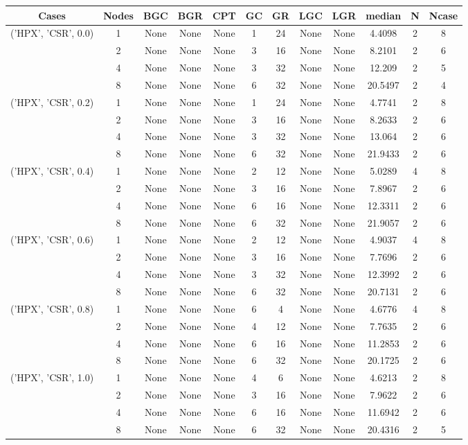 \begin{tabular}{cccccccccccc}
\hline
Cases & Nodes& BGC& BGR& CPT& GC& GR& LGC& LGR& median & N & Ncase \\
\hline
\multirow{4}{*}{('HPX', 'CSR', 0.0)}& 1& None& None& None& 1& 24& None& None& 4.4098& 2& 8\\
& 2& None& None& None& 3& 16& None& None& 8.2101& 2& 6\\
& 4& None& None& None& 3& 32& None& None& 12.209& 2& 5\\
& 8& None& None& None& 6& 32& None& None& 20.5497& 2& 4\\
\hline
\multirow{4}{*}{('HPX', 'CSR', 0.2)}& 1& None& None& None& 1& 24& None& None& 4.7741& 2& 8\\
& 2& None& None& None& 3& 16& None& None& 8.2633& 2& 6\\
& 4& None& None& None& 3& 32& None& None& 13.064& 2& 6\\
& 8& None& None& None& 6& 32& None& None& 21.9433& 2& 6\\
\hline
\multirow{4}{*}{('HPX', 'CSR', 0.4)}& 1& None& None& None& 2& 12& None& None& 5.0289& 4& 8\\
& 2& None& None& None& 3& 16& None& None& 7.8967& 2& 6\\
& 4& None& None& None& 6& 16& None& None& 12.3311& 2& 6\\
& 8& None& None& None& 6& 32& None& None& 21.9057& 2& 6\\
\hline
\multirow{4}{*}{('HPX', 'CSR', 0.6)}& 1& None& None& None& 2& 12& None& None& 4.9037& 4& 8\\
& 2& None& None& None& 3& 16& None& None& 7.7696& 2& 6\\
& 4& None& None& None& 3& 32& None& None& 12.3992& 2& 6\\
& 8& None& None& None& 6& 32& None& None& 20.7131& 2& 6\\
\hline
\multirow{4}{*}{('HPX', 'CSR', 0.8)}& 1& None& None& None& 6& 4& None& None& 4.6776& 4& 8\\
& 2& None& None& None& 4& 12& None& None& 7.7635& 2& 6\\
& 4& None& None& None& 6& 16& None& None& 11.2853& 2& 6\\
& 8& None& None& None& 6& 32& None& None& 20.1725& 2& 6\\
\hline
\multirow{4}{*}{('HPX', 'CSR', 1.0)}& 1& None& None& None& 4& 6& None& None& 4.6213& 2& 8\\
& 2& None& None& None& 3& 16& None& None& 7.9622& 2& 6\\
& 4& None& None& None& 6& 16& None& None& 11.6942& 2& 6\\
& 8& None& None& None& 6& 32& None& None& 20.4316& 2& 5\\
\hline
\end{tabular}
